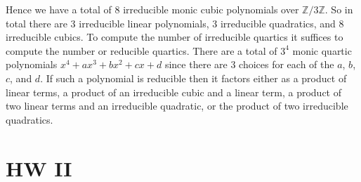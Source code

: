 \documentclass{article}                                                        %
\begin{document}
\begin{solution}
            Hence we have a total of 8 irreducible monic cubic polynomials over
            $\mathbb{Z}/3\mathbb{Z}$. So in total there are 3 irreducible
            linear polynomials, 3 irreducible quadratics, and 8 irreducible
            cubics. To compute the number of irreducible quartics it suffices to
            compute the number or reducible quartics. There are a total of
            $3^{4}$ monic quartic polynomials $x^{4}+ax^{3}+bx^{2}+cx+d$ since
            there are 3 choices for each of the $a$, $b$, $c$, and $d$. If such
            a polynomial is reducible then it factors either as a product of
            linear terms, a product of an irreducible cubic and a linear term,
            a product of two linear terms and an irreducible quadratic, or the
            product of two irreducible quadratics.
        \end{solution}
    \section{HW II}
\end{document}
